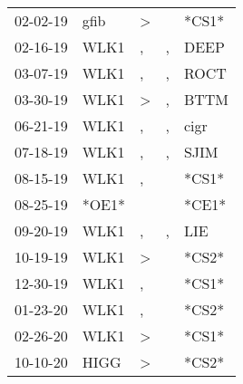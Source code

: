 \begin{supertabular}{lllll}
 02-02-19 &   gfib &  \textgreater &               &  *CS1* \\
 02-16-19 &   WLK1 &             , &             , &   DEEP \\
 03-07-19 &   WLK1 &             , &             , &   ROCT \\
 03-30-19 &   WLK1 &  \textgreater &             , &   BTTM \\
 06-21-19 &   WLK1 &             , &             , &   cigr \\
 07-18-19 &   WLK1 &             , &             , &   SJIM \\
 08-15-19 &   WLK1 &             , &               &  *CS1* \\
 08-25-19 &  *OE1* &               &               &  *CE1* \\
 09-20-19 &   WLK1 &             , &             , &    LIE \\
 10-19-19 &   WLK1 &  \textgreater &               &  *CS2* \\
 12-30-19 &   WLK1 &             , &               &  *CS1* \\
 01-23-20 &   WLK1 &             , &               &  *CS2* \\
 02-26-20 &   WLK1 &  \textgreater &               &  *CS1* \\
 10-10-20 &   HIGG &  \textgreater &               &  *CS2* \\
\end{supertabular}
